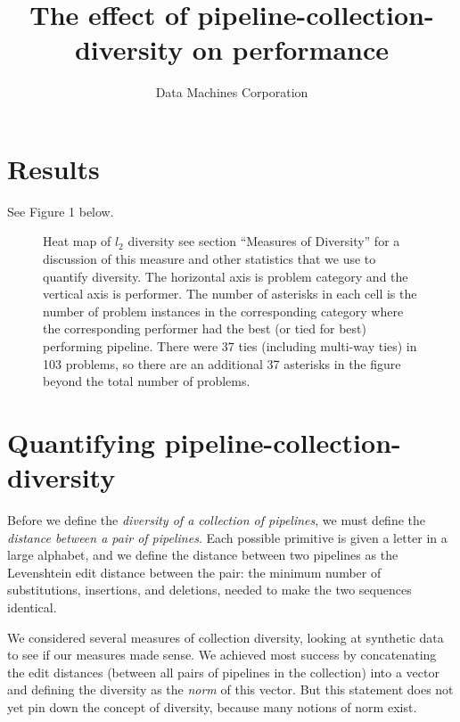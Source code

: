 \documentclass{article}
\title{The effect of pipeline-collection-diversity on performance}
\author{Data Machines Corporation}
\begin{document}
\maketitle


\section{Results}
See Figure 1 below.
\begin{figure}
\caption{Heat map of $l_2$ diversity see section ``Measures of
  Diversity'' for a discussion of this measure and other statistics
  that we use to quantify diversity.  The horizontal axis is problem
  category and the vertical axis is performer.  The number of
  asterisks in each cell is the number of problem instances in the
  corresponding category where the corresponding performer had the
  best (or tied for best) performing pipeline.  There were 37 ties
  (including multi-way ties) in 103 problems, so there are an
  additional 37 asterisks in the figure beyond the total number of
  problems.}
\end{figure}

\section{Quantifying pipeline-collection-diversity}
  Before we define the \emph{diversity of a collection of pipelines},
  we must define the \emph{distance between a pair of pipelines}.
  Each possible primitive is given a letter in a large alphabet, and
  we define the distance between two pipelines as the Levenshtein edit
  distance between the pair: the minimum number of substitutions,
  insertions, and deletions, needed to make the two sequences
  identical.

  We considered several measures of collection diversity, looking at
  synthetic data to see if our measures made sense.  We achieved most
  success by concatenating the edit distances (between all pairs of
  pipelines in the collection) into a vector and defining the
  diversity as the \emph{norm} of this vector.  But this statement
  does not yet pin down the concept of diversity, because many notions
  of norm exist.
\end{document}
